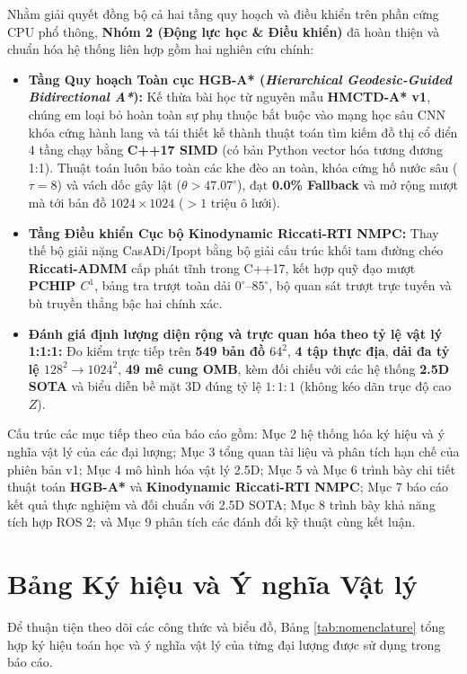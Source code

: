 \documentclass[12pt, a4paper]{article}
\begin{document}
Nhằm giải quyết đồng bộ cả hai tầng quy hoạch và điều khiển trên phần cứng CPU phổ thông, \textbf{Nhóm 2 (Động lực học \& Điều khiển)} đã hoàn thiện và chuẩn hóa hệ thống liên hợp gồm hai nghiên cứu chính:
\begin{itemize}
    \item \textbf{Tầng Quy hoạch Toàn cục \textbf{HGB-A*} (\textit{Hierarchical Geodesic-Guided Bidirectional A*}):} Kế thừa bài học từ nguyên mẫu \textbf{HMCTD-A* v1}, chúng em loại bỏ hoàn toàn sự phụ thuộc bắt buộc vào mạng học sâu CNN khóa cứng hành lang và tái thiết kế thành thuật toán tìm kiếm đồ thị cổ điển 4 tầng chạy bằng \textbf{C++17 SIMD} (có bản Python vector hóa tương đương 1:1). Thuật toán luôn bảo toàn các khe đèo an toàn, khóa cứng hố nước sâu ($\tau=8$) và vách dốc gây lật ($\theta > 47.07^\circ$), đạt \textbf{0.0\% Fallback} và mở rộng mượt mà tới bản đồ $1024 \times 1024$ ($>1$ triệu ô lưới).
    \item \textbf{Tầng Điều khiển Cục bộ \textbf{Kinodynamic Riccati-RTI NMPC}:} Thay thế bộ giải nặng CasADi/Ipopt bằng bộ giải cấu trúc khối tam đường chéo \textbf{Riccati-ADMM} cấp phát tĩnh trong C++17, kết hợp quỹ đạo mượt \textbf{PCHIP $C^1$}, bảng tra trượt toàn dải $0^\circ\text{--}85^\circ$, bộ quan sát trượt trực tuyến và bù truyền thẳng bậc hai chính xác.
    \item \textbf{Đánh giá định lượng diện rộng và trực quan hóa theo tỷ lệ vật lý 1:1:1:} Đo kiểm trực tiếp trên \textbf{549 bản đồ $64^2$}, \textbf{4 tập thực địa}, \textbf{dải đa tỷ lệ $128^2 \to 1024^2$}, \textbf{49 mê cung OMB}, kèm đối chiếu với các hệ thống \textbf{2.5D SOTA} và biểu diễn bề mặt 3D đúng tỷ lệ $1{:}1{:}1$ (không kéo dãn trục độ cao $Z$).
\end{itemize}

Cấu trúc các mục tiếp theo của báo cáo gồm: Mục 2 hệ thống hóa ký hiệu và ý nghĩa vật lý của các đại lượng; Mục 3 tổng quan tài liệu và phân tích hạn chế của phiên bản v1; Mục 4 mô hình hóa vật lý 2.5D; Mục 5 và Mục 6 trình bày chi tiết thuật toán \textbf{HGB-A*} và \textbf{Kinodynamic Riccati-RTI NMPC}; Mục 7 báo cáo kết quả thực nghiệm và đối chuẩn với 2.5D SOTA; Mục 8 trình bày khả năng tích hợp ROS 2; và Mục 9 phân tích các đánh đổi kỹ thuật cùng kết luận.

\section{Bảng Ký hiệu và Ý nghĩa Vật lý}
Để thuận tiện theo dõi các công thức và biểu đồ, Bảng \ref{tab:nomenclature} tổng hợp ký hiệu toán học và ý nghĩa vật lý của từng đại lượng được sử dụng trong báo cáo.
\end{document}
